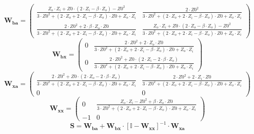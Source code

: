 \[ \mathbf{W_{ba}} = \left(\begin{smallmatrix} \frac{Z_o\cdot Z_i+Z0\cdot \left(2\cdot Z_i-\beta\cdot Z_o\right)-Z0^2}{3\cdot Z0^2+\left(2\cdot Z_o+2\cdot Z_i-\beta\cdot Z_o\right)\cdot Z0+Z_o\cdot Z_i} & \frac{2\cdot Z0^2}{3\cdot Z0^2+\left(2\cdot Z_o+2\cdot Z_i-\beta\cdot Z_o\right)\cdot Z0+Z_o\cdot Z_i} \\ \frac{2\cdot Z0^2+2\cdot \beta\cdot Z_o\cdot Z0}{3\cdot Z0^2+\left(2\cdot Z_o+2\cdot Z_i-\beta\cdot Z_o\right)\cdot Z0+Z_o\cdot Z_i} & \frac{Z_o\cdot Z_i+Z0\cdot \left(2\cdot Z_o-\beta\cdot Z_o\right)-Z0^2}{3\cdot Z0^2+\left(2\cdot Z_o+2\cdot Z_i-\beta\cdot Z_o\right)\cdot Z0+Z_o\cdot Z_i} \end{smallmatrix}\right) \]
\[ \mathbf{W_{bx}} = \left(\begin{smallmatrix} 0 & \frac{2\cdot Z0^2+2\cdot Z_o\cdot Z0}{3\cdot Z0^2+\left(2\cdot Z_o+2\cdot Z_i-\beta\cdot Z_o\right)\cdot Z0+Z_o\cdot Z_i} \\ 0 & \frac{2\cdot Z0^2+Z0\cdot \left(2\cdot Z_i-2\cdot \beta\cdot Z_o\right)}{3\cdot Z0^2+\left(2\cdot Z_o+2\cdot Z_i-\beta\cdot Z_o\right)\cdot Z0+Z_o\cdot Z_i} \end{smallmatrix}\right) \]
\[ \mathbf{W_{xa}} = \left(\begin{smallmatrix} \frac{2\cdot Z0^2+Z0\cdot \left(2\cdot Z_o-2\cdot \beta\cdot Z_o\right)}{3\cdot Z0^2+\left(2\cdot Z_o+2\cdot Z_i-\beta\cdot Z_o\right)\cdot Z0+Z_o\cdot Z_i} & \frac{2\cdot Z0^2+2\cdot Z_i\cdot Z0}{3\cdot Z0^2+\left(2\cdot Z_o+2\cdot Z_i-\beta\cdot Z_o\right)\cdot Z0+Z_o\cdot Z_i} \\ 0 & 0 \end{smallmatrix}\right) \]
\[ \mathbf{W_{xx}} = \left(\begin{smallmatrix} 0 & \frac{Z_o\cdot Z_i-Z0^2+\beta\cdot Z_o\cdot Z0}{3\cdot Z0^2+\left(2\cdot Z_o+2\cdot Z_i-\beta\cdot Z_o\right)\cdot Z0+Z_o\cdot Z_i} \\ -1 & 0 \end{smallmatrix}\right) \]
\[ \mathbf{S}=\mathbf{W_{ba}}+\mathbf{W_{bx}}\cdot\left[ \mathbb{I}  -\mathbf{W_{xx}}\right]^{-1}\cdot\mathbf{W_{xa}} \]
